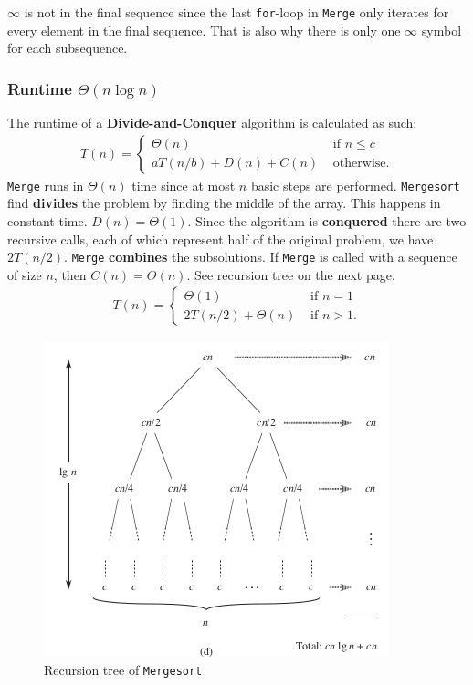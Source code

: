 $\infty$ is not in the final sequence since the last \texttt{for}-loop in
\texttt{Merge} only iterates for every element in the final sequence. That is
also why there is only one $\infty$ symbol for each subsequence.

\subsubsection*{Runtime $\Theta(n\log n)$}
The runtime of a \textbf{Divide-and-Conquer} algorithm is calculated as such:
\begin{align*}
  T(n)=
  \begin{cases}
    \Theta(n)&\textrm{ if }n\leq c\\
    aT(n/b)+D(n)+C(n)&\textrm{ otherwise.}
  \end{cases}
\end{align*}
\texttt{Merge} runs in $\Theta(n)$ time since at most $n$ basic steps are
performed. \texttt{Mergesort} find \textbf{divides} the problem by finding the
middle of the array. This happens in constant time. $D(n)=\Theta(1)$.
\newline\newline
Since the algorithm is \textbf{conquered} there are two recursive calls, each of
which represent half of the original problem, we have $2T(n/2)$.
\newline\newline
\texttt{Merge} \textbf{combines} the subsolutions. If \texttt{Merge} is called
with a sequence of size $n$, then $C(n)=\Theta(n)$.
\newline\newline
See recursion tree on the next page.
\begin{align*}
  T(n)=
  \begin{cases}
    \Theta(1)&\textrm{ if }n=1\\
    2T(n/2)+\Theta(n)&\textrm{ if }n>1.
  \end{cases}
\end{align*}
\begin{figure}[H]
  \includegraphics[scale=0.75]{pictures/recursiontree.png}
  \caption{Recursion tree of \texttt{Mergesort}}
\end{figure}
